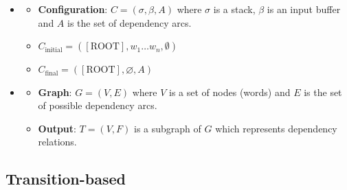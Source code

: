 \documentclass[xcolor=table]{beamer}
\begin{document}
\begin{frame}
	\frametitle{\insertshortsubtitle}
	\framesubtitle{\insertsection}

	\begin{minipage}{.6\textwidth}
	\begin{itemize}
		\item {} 
		\begin{itemize}
			\item \textbf{Configuration}:  $C = (\sigma, \beta, A)$ where $\sigma$ is a stack, $\beta$ is an input buffer and $A$ is the set of dependency arcs.
			\item $C_{\text{initial}} = ([\text{ROOT}], w_1 \ldots w_n, \emptyset)$
			\item $C_{\text{final}} = ([\text{ROOT}], \varnothing, A)$
		\end{itemize}
	\end{itemize}
	\end{minipage}
	\begin{minipage}{.38\textwidth}
	\end{minipage}
	
	\vfill
	
	\begin{minipage}{.6\textwidth}
		\begin{itemize}
			\item {}
			\begin{itemize}
				\item \textbf{Graph}: $G = (V, E)$ where $V$ is a set of nodes (words) and $E$ is the set of possible dependency arcs.
				\item \textbf{Output}: $T = (V, F)$ is a subgraph of $G$ which represents dependency relations.
			\end{itemize}
		\end{itemize}
	\end{minipage}
	\begin{minipage}{.38\textwidth}
	\end{minipage}

\end{frame}

\subsection{Transition-based}
\end{document}
